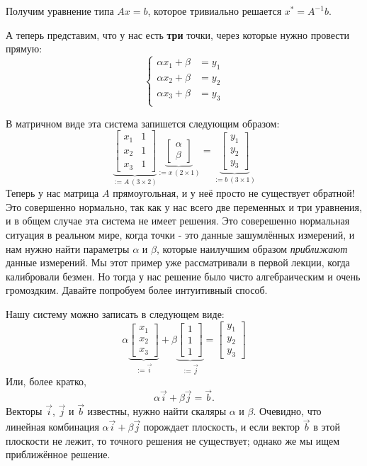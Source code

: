 \documentclass{article}
\begin{document}
Получим уравнение типа $Ax = b$, которое тривиально решается $x^* = A^{-1}b$.

А теперь представим, что у нас есть \textbf{три} точки, через которые нужно провести прямую:
$$
\left\{
\begin{split}
\alpha x_1 + \beta &= y_1\\
\alpha x_2 + \beta &= y_2\\
\alpha x_3 + \beta &= y_3\\
\end{split}
\right.
$$

В матричном виде эта система запишется следующим образом:
$$
\underbrace{\begin{bmatrix}x_1  & 1 \\ x_2 & 1 \\x_3 & 1 \end{bmatrix} }_{:= A\,(3\times 2)}
\underbrace{\begin{bmatrix} \alpha \\ \beta \end{bmatrix}}_{:=x\,(2\times 1)} = \underbrace{\begin{bmatrix} y_1 \\ y_2 \\ y_3 \end{bmatrix}}_{:=b\, (3\times 1)}
$$
Теперь у нас матрица $A$ прямоугольная, и у неё просто не существует обратной! Это совершенно нормально, так как у нас всего две переменных и три уравнения, и в общем случае эта система не имеет решения.
Это соверешенно нормальная ситуация в реальном мире, когда точки - это данные зашумлённых измерений, и нам нужно найти параметры $\alpha$ и $\beta$, которые наилучшим образом \textit{приближают} данные измерений.
Мы этот пример уже рассматривали в первой лекции, когда калибровали безмен. Но тогда у нас решение было чисто алгебраическим и очень громоздким. Давайте попробуем более интуитивный способ.

Нашу систему можно записать в следующем виде:
$$
\alpha \underbrace{\begin{bmatrix}x_1  \\ x_2 \\x_3  \end{bmatrix} }_{:=\vec{i}}
+\beta \underbrace{\begin{bmatrix}1 \\ 1 \\1 \end{bmatrix} }_{:=\vec{j}} = 
\begin{bmatrix}y_1\\y_2\\y_3\end{bmatrix}
$$
Или, более кратко, 
$$
\alpha \vec{i} + \beta\vec{j} = \vec{b}.
$$
Векторы $\vec i$, $\vec j$ и $\vec b$ известны, нужно найти скаляры $\alpha$ и $\beta$.
Очевидно, что линейная комбинация $\alpha \vec{i} + \beta\vec{j}$ порождает плоскость, и если вектор $\vec b$ в этой плоскости не лежит, то точного решения не существует; однако же мы ищем приближённое решение.
\end{document}
